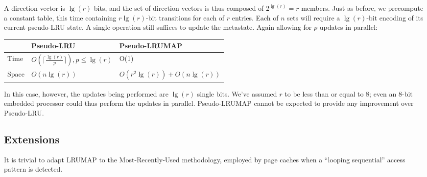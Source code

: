 \documentclass[letterpaper,10pt]{article}
\begin{document}
\begin{multicols}{2}
A direction vector is $\lg{(r)}$ bits, and the set of direction vectors is thus
composed of $2^{\lg{(r)}}=r$ members. Just as before, we precompute a constant
table, this time containing $r \lg{(r)}$-bit transitions for each of $r$
entries. Each of $n$ sets will require a $\lg{(r)}$-bit encoding of its current
pseudo-LRU state. A single operation still suffices to update the metastate.
Again allowing for $p$ updates in parallel:
\begin{center}
\begin{tabular}{|l|l|l|}
\hline
 & Pseudo-LRU & Pseudo-LRUMAP \\
\hline
Time & $O(\lceil\frac{\lg{(r)}}{p}\rceil), {p}\le{\lg{(r)}}$ & O(1) \\
\hline
Space & $O(n\lg{(r)})$ & $O(r^{2}\lg{(r)}) + O(n\lg{(r)})$ \\
\hline
\end{tabular}
\end{center}
In this case, however, the updates being performed are $\lg{(r)}$ single bits.
We've assumed $r$ to be less than or equal to 8; even an 8-bit embedded processor
could thus perform the updates in parallel. Pseudo-LRUMAP cannot be expected to
provide any improvement over Pseudo-LRU.
\subsection{Extensions}
It is trivial to adapt LRUMAP to the Most-Recently-Used methodology, employed
by page caches when a ``looping sequential''\cite{dewitt} access pattern is
detected.


\end{multicols}
\end{document}
